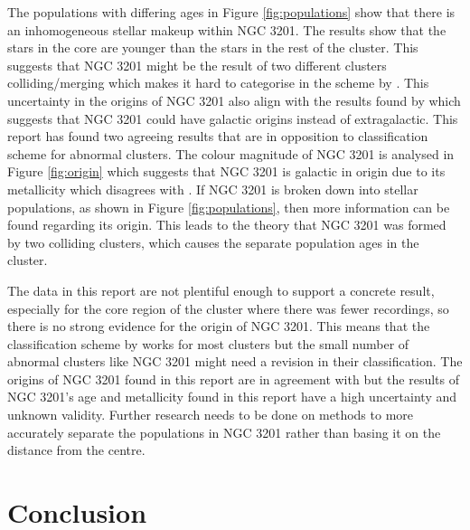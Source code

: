 \documentclass[11pt]{article}
\begin{document}
The populations with differing ages in Figure \ref{fig:populations} show that there is an inhomogeneous stellar makeup within NGC 3201. The results show that the stars in the core are younger than the stars in the rest of the cluster. This suggests that NGC 3201 might be the result of two different clusters colliding/merging which makes it hard to categorise in the scheme by \citet{Mackey}. This uncertainty in the origins of NGC 3201 also align with the results found by \citet{god} which suggests that NGC 3201 could have galactic origins instead of extragalactic. This report has found two agreeing results that are in opposition to \citet{Mackey} classification scheme for abnormal clusters. The colour magnitude of NGC 3201 is analysed in Figure \ref{fig:origin} which suggests that NGC 3201 is galactic in origin due to its metallicity which disagrees with \citet{Mackey}. If NGC 3201 is broken down into stellar populations, as shown in Figure \ref{fig:populations}, then more information can be found regarding its origin. This leads to the theory that NGC 3201 was formed by two colliding clusters, which causes the separate population ages in the cluster. 

The data in this report are not plentiful enough to support a concrete result, especially for the core region of the cluster where there was fewer recordings, so there is no strong evidence for the origin of NGC 3201. This means that the classification scheme by \citet{Mackey} works for most clusters but the small number of abnormal clusters like NGC 3201  might need a revision in their classification. The origins of NGC 3201 found in this report are in agreement with \citet{god} but the results of NGC 3201's age and metallicity found in this report have a high uncertainty and unknown validity. Further research needs to be done on methods to more accurately separate the populations in NGC 3201 rather than basing it on the distance from the centre.

\section{Conclusion}
\end{document}
